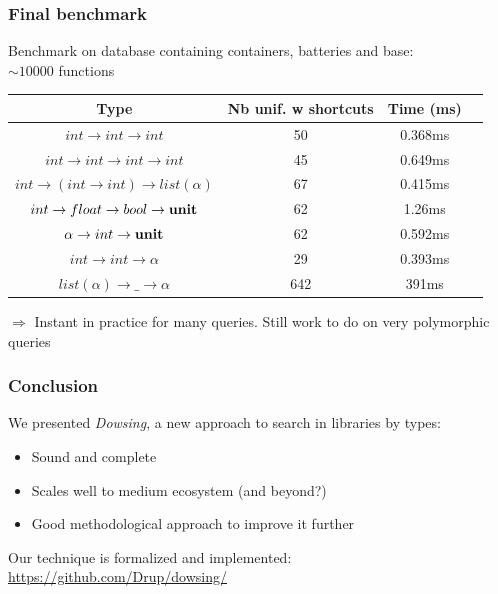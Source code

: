 \documentclass[aspectratio=169,dvipsnames,svgnames,10pt]{beamer}
\begin{document}
\begin{frame}[fragile]
  \frametitle{Final benchmark}

  Benchmark on database containing containers, batteries and base:\\
  $\sim 10000$ functions
\begin{table}[h]
  \centering
  \begin{tabular}{|*{4}{c|}}
    \hline
      Type &
      Nb unif. w shortcuts &
      Time (ms)
    \\
    \hline
      $int \rightarrow int \rightarrow int$ &
      50 & 0.368ms 
    \\
      $int \rightarrow int \rightarrow int \rightarrow int$ &
      45 & 0.649ms 
    \\
      $int \rightarrow (int \rightarrow int) \rightarrow list (\alpha)$ &
      67 & 0.415ms 
    \\
      $int \rightarrow float \rightarrow bool \rightarrow \bold{unit}$ &
      62 & 1.26ms 
    \\
      $\alpha \rightarrow int \rightarrow \bold{unit}$ &
      62 & 0.592ms 
    \\
      $int \rightarrow int \rightarrow \alpha$ &
      29 & 0.393ms 
    \\
      $list(\alpha) \rightarrow \_ \rightarrow \alpha$ &
      642 & 391ms 
    \\
    \hline
  \end{tabular}

\end{table}
  $\Rightarrow$ Instant in practice for many queries. Still work to do on very
  polymorphic queries
\end{frame}


\begin{frame}
  \frametitle{Conclusion}

  We presented \emph{Dowsing}, a new approach to search in libraries by types:
  \begin{itemize}
  \item Sound and complete
  \item Scales well to medium ecosystem (and beyond?)
  \item Good methodological approach to improve it further
  \end{itemize}
  
  Our technique is formalized and implemented: \url{https://github.com/Drup/dowsing/}
\end{frame}
\end{document}
